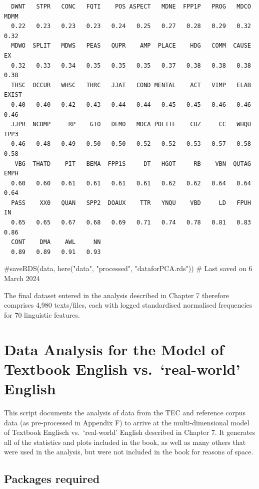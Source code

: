 \documentclass[
  letterpaper,
  DIV=11,
  numbers=noendperiod]{scrreprt}
\newenvironment{Shaded}{\begin{snugshade}}{\end{snugshade}}
\newcommand{\CommentTok}[1]{\textcolor[rgb]{0.37,0.37,0.37}{#1}}
\begin{document}
\begin{verbatim}
  DWNT   STPR   CONC   FQTI    POS ASPECT   MDNE  FPP1P   PROG   MDCO   MDMM 
  0.22   0.23   0.23   0.23   0.24   0.25   0.27   0.28   0.29   0.32   0.32 
  MDWO  SPLIT   MDWS   PEAS   QUPR    AMP  PLACE    HDG   COMM  CAUSE     EX 
  0.32   0.33   0.34   0.35   0.35   0.35   0.37   0.38   0.38   0.38   0.38 
  THSC  OCCUR   WHSC   THRC   JJAT   COND MENTAL    ACT   VIMP   ELAB  EXIST 
  0.40   0.40   0.42   0.43   0.44   0.44   0.45   0.45   0.46   0.46   0.46 
  JJPR  NCOMP     RP    GTO   DEMO   MDCA POLITE    CUZ     CC   WHQU   TPP3 
  0.46   0.48   0.49   0.50   0.50   0.52   0.52   0.53   0.57   0.58   0.58 
   VBG  THATD    PIT   BEMA  FPP1S     DT   HGOT     RB    VBN  QUTAG   EMPH 
  0.60   0.60   0.61   0.61   0.61   0.61   0.62   0.62   0.64   0.64   0.64 
  PASS    XX0   QUAN   SPP2  DOAUX    TTR   YNQU    VBD     LD   FPUH     IN 
  0.65   0.65   0.67   0.68   0.69   0.71   0.74   0.78   0.81   0.83   0.86 
  CONT    DMA    AWL     NN 
  0.89   0.89   0.91   0.93 
\end{verbatim}

\begin{Shaded}
\begin{Highlighting}[]
\CommentTok{\#saveRDS(data, here("data", "processed", "dataforPCA.rds")) \# Last saved on 6 March 2024}
\end{Highlighting}
\end{Shaded}

The final dataset entered in the analysis described in Chapter 7
therefore comprises 4,980 texts/files, each with logged standardised
normalised frequencies for 70 linguistic features.

\chapter{Data Analysis for the Model of Textbook English
vs.~`real-world'
English}\label{data-analysis-for-the-model-of-textbook-english-vs.-real-world-english}

This script documents the analysis of data from the TEC and reference
corpus data (as pre-processed in Appendix F) to arrive at the
multi-dimensional model of Textbook Englisch vs.~`real-world' English
described in Chapter 7. It generates all of the statistics and plots
included in the book, as well as many others that were used in the
analysis, but were not included in the book for reasons of space.

\section{Packages required}\label{packages-required-4}
\end{document}
